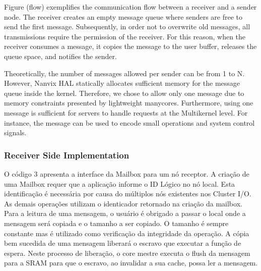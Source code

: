 
			Figure (flow) exemplifies the communication flow between a receiver and a sender node. The receiver creates an empty message queue where senders are free to send the first message. Subsequently, in order not to overwrite old messages, all transmissions require the permission of the receiver. For this reason,  when the receiver consumes a message, it copies the message to the user buffer, releases the queue space, and notifies the sender.
			
			Theoretically, the number of messages allowed per sender can be from 1 to N.  However, Nanvix HAL statically allocates sufficient memory for the message queue inside the kernel. Therefore, we chose to allow only one message due to memory constraints presented by lightweight manycores. Furthermore, using one message is sufficient for servers to handle requests at the Multikernel level. For instance, the message can be used to encode small operations and system control signals.
			
			\subsubsection{Receiver Side Implementation}

				O código 3 apresenta a interface da Mailbox para um nó receptor.
				A criação de uma Mailbox requer que a aplicação informe o ID Lógico no nó local.
				Esta identificação é necessária por causa do múltiplos nós existentes nos Cluster I/O.
				As demais operações utilizam o identicador retornado na criação da mailbox.
				Para a leitura de uma mensagem, o usuário é obrigado a passar o local onde a mensagem será copiada e o tamanho a ser copiado.
				O tamanho é sempre constante mas é utilizado como verificação da integridade da operação.
				A cópia bem sucedida de uma mensagem liberará o escravo que executar a função de espera.
				Neste processo de liberação, o core mestre executa o flush da mensagem para a SRAM para que o escravo, ao invalidar a sua cache, possa ler a mensagem.

